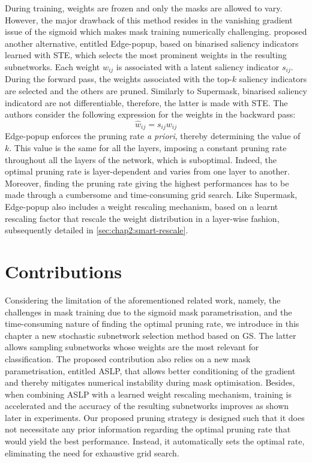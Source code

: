 During training, weights are frozen and only the masks are allowed to vary.
However, the major drawback of this method resides in the vanishing gradient
issue of the sigmoid which makes mask training numerically challenging.
\citeauthor{DBLP:conf/cvpr/RamanujanWKFR20}
\cite{DBLP:conf/cvpr/RamanujanWKFR20} proposed another alternative, entitled
Edge-popup, based on binarised saliency indicators learned with \ac{STE}, which
selects the most prominent weights in the resulting subnetworks. Each weight
$w_{ij}$ is associated with a latent saliency indicator $s_{ij}.$ During the
forward pass, the weights associated with the top-$k$ saliency indicators are
selected and the others are pruned. Similarly to Supermask, binarised saliency
indicatord are not differentiable, therefore, the latter is made with \ac{STE}.
The authors consider the following expression for the weights in the backward
pass:
\begin{equation}
  \hat{w}_{ij} = s_{ij} w_{ij}
\end{equation}
Edge-popup enforces the pruning rate \textit{a priori}, thereby determining the
value of $k$. This value is the same for all the layers, imposing a constant
pruning rate throughout all the layers of the network, which is suboptimal.
Indeed, the optimal pruning rate is layer-dependent and varies from one layer to
another. Moreover, finding the pruning rate giving the highest performances has
to be made through a cumbersome and time-consuming grid search. Like Supermask,
Edge-popup also includes a weight rescaling mechanism, based on a learnt
rescaling factor that rescale the weight distribution in a layer-wise fashion,
subsequently detailed in \cref{sec:chap2:smart-rescale}.\\

\section{Contributions}
\label{sec:chap2:intro_contributions}

Considering the limitation of the aforementioned related work, namely, the
challenges in mask training due to the sigmoid mask parametrisation, and the
time-consuming nature of finding the optimal pruning rate, we introduce in this
chapter a new stochastic subnetwork selection method based on \ac{GS}. The
latter allows sampling subnetworks whose weights are the most relevant for
classification. The proposed contribution also relies on a new mask
parametrisation, entitled \acf{ASLP}, that allows better conditioning of the
gradient and thereby mitigates numerical instability during mask optimisation.
Besides, when combining \ac{ASLP} with a learned weight rescaling mechanism,
training is accelerated and the accuracy of the resulting subnetworks improves
as shown later in experiments. Our proposed pruning strategy is designed such
that it does not necessitate any prior information regarding the optimal pruning
rate that would yield the best performance. Instead, it automatically sets the
optimal rate, eliminating the need for exhaustive grid search.\\ 

